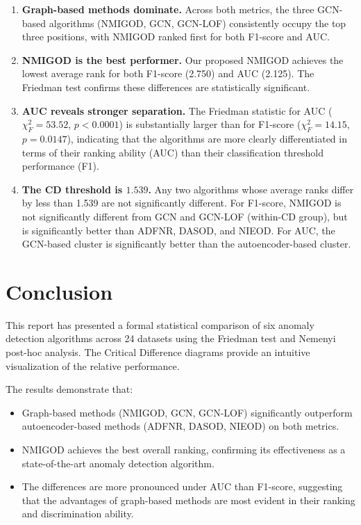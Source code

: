 \documentclass[11pt,a4paper]{article}
\begin{document}
\begin{enumerate}
  \item \textbf{Graph-based methods dominate.} Across both metrics, the three
        GCN-based algorithms (NMIGOD, GCN, GCN-LOF) consistently occupy the top
        three positions, with NMIGOD ranked first for both F1-score and AUC.

  \item \textbf{NMIGOD is the best performer.} Our proposed NMIGOD achieves the
        lowest average rank for both F1-score (2.750) and AUC (2.125). The
        Friedman test confirms these differences are statistically significant.

  \item \textbf{AUC reveals stronger separation.} The Friedman statistic for AUC
        ($\chi_F^2 = 53.52$, $p < 0.0001$) is substantially larger than for
        F1-score ($\chi_F^2 = 14.15$, $p = 0.0147$), indicating that the
        algorithms are more clearly differentiated in terms of their ranking
        ability (AUC) than their classification threshold performance (F1).

  \item \textbf{The CD threshold is $\mathbf{1.539}$.} Any two algorithms whose
        average ranks differ by less than 1.539 are not significantly different.
        For F1-score, NMIGOD is not significantly different from GCN and GCN-LOF
        (within-CD group), but is significantly better than ADFNR, DASOD, and
        NIEOD. For AUC, the GCN-based cluster is significantly better than the
        autoencoder-based cluster.
\end{enumerate}

\section{Conclusion}

This report has presented a formal statistical comparison of six anomaly
detection algorithms across 24 datasets using the Friedman test and Nemenyi
post-hoc analysis. The Critical Difference diagrams provide an intuitive
visualization of the relative performance.

The results demonstrate that:
\begin{itemize}
  \item Graph-based methods (NMIGOD, GCN, GCN-LOF) significantly outperform
        autoencoder-based methods (ADFNR, DASOD, NIEOD) on both metrics.
  \item NMIGOD achieves the best overall ranking, confirming its effectiveness
        as a state-of-the-art anomaly detection algorithm.
  \item The differences are more pronounced under AUC than F1-score, suggesting
        that the advantages of graph-based methods are most evident in their
        ranking and discrimination ability.
\end{itemize}
\end{document}
